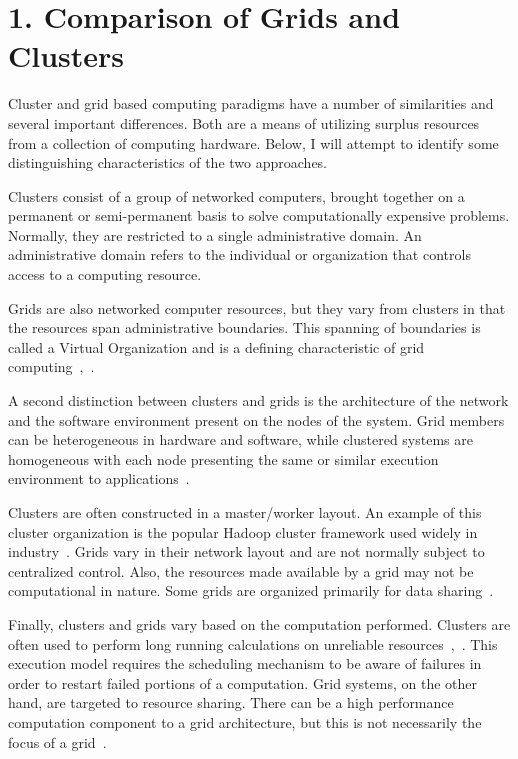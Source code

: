 \documentclass[12pt]{article}
\date{\today}
\begin{document}
\maketitle

\section*{1. Comparison of Grids and Clusters}
Cluster and grid based computing paradigms have a number of
similarities and several important differences. Both are a means of
utilizing surplus resources from a collection of computing
hardware. Below, I will attempt to identify some distinguishing
characteristics of the two approaches.

Clusters consist of a group of networked computers, brought together
on a permanent or semi-permanent basis to solve computationally
expensive problems.  Normally, they are restricted to a single
administrative domain. An administrative domain refers to the individual
or organization that controls access to a computing resource.

Grids are also networked computer resources, but they vary from
clusters in that the resources span administrative boundaries. This
spanning of boundaries is called a Virtual Organization and is a
defining characteristic of grid computing~\cite{classtext},~\cite{anatomy}.

A second distinction between clusters and grids is the architecture of
the network and the software environment present on the nodes of the
system. Grid members can be heterogeneous in hardware and software,
while clustered systems are homogeneous with each node presenting
the same or similar execution environment to applications~\cite{classtext}.

Clusters are often constructed in a master/worker layout. An example
of this cluster organization is the popular Hadoop cluster framework
used widely in industry~\cite{hadoop}. Grids vary in their network
layout and are not normally subject to centralized control.  Also, the
resources made available by a grid may not be computational in
nature. Some grids are organized primarily for data
sharing~\cite{anatomy}.

Finally, clusters and grids vary based on the computation performed.
Clusters are often used to perform long running calculations on
unreliable resources~\cite{hadoop},~\cite{condor-man}. This execution
model requires the scheduling mechanism to be aware of failures in
order to restart failed portions of a computation. Grid systems, on
the other hand, are targeted to resource sharing. There can be a high
performance computation component to a grid architecture, but this is
not necessarily the focus of a grid~\cite{anatomy}.
\end{document}
